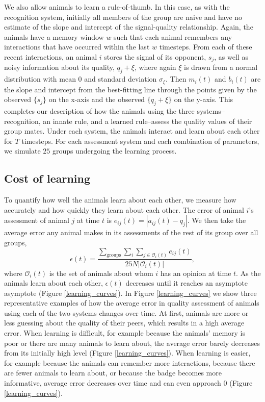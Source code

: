 We also allow animals to learn a rule-of-thumb. In this case, as with the recognition system, initially all members of the group are naive and have no estimate of the slope and intercept of the signal-quality relationship. Again, the animals have a memory window $w$ such that each animal remembers any interactions that have occurred within the last $w$ timesteps. From each of these recent interactions, an animal $i$ stores the signal of its opponent, $s_j$, as well as noisy information about its quality, $q_j+\xi$, where again $\xi$ is drawn from a normal distribution with mean $0$ and standard deviation $\sigma_\xi$.  Then $m_i(t)$ and $b_i(t)$ are the slope and intercept from the best-fitting line through the points given by the observed $\{s_j\}$ on the x-axis and the observed $\{q_j+\xi\}$ on the y-axis. This completes our description of how the animals using the three systems--recognition, an innate rule, and a learned rule--assess the quality values of their group mates. Under each system, the animals interact and learn about each other for $T$ timesteps. For each assessment system and each combination of parameters, we simulate $25$ groups undergoing the learning process. 
 
\subsection{Cost of learning }
To quantify how well the animals learn about each other, we measure how accurately and how quickly they learn about each other. The error of animal $i$'s assessment of animal $j$ at time $t$ is $e_{ij}(t)=|a_{ij}(t)-q_j|$. We then take the average error any animal makes in its assessments of the rest of its group over all groups, 
\begin{equation*}
\epsilon(t) = \frac{\sum_{\text{groups}}\sum_i\sum_{j\in \mathscr{O}_i(t)}e_{ij}(t)}{25N|\mathscr{O}_i(t)|},
\end{equation*}
where $\mathscr{O}_i(t)$ is the set of animals about whom $i$ has an opinion at time $t$.
As the animals learn about each other, $\epsilon(t)$ decreases until it reaches an asymptote asymptote (Figure \ref{learning_curves}). In Figure \ref{learning_curves} we show three representative examples of how the average error in quality assessment of animals using each of the two systems changes over time. At first, animals are more or less guessing about the quality of their peers, which results in a high average error. When learning is difficult, for example because the animals' memory is poor or there are many animals to learn about, the average error barely decreases from its initially high level (Figure \ref{learning_curves}). When learning is easier, for example because the animals can remember more interactions, because there are fewer animals to learn about, or because the badge becomes more informative, average error decreases over time and can even approach $0$ (Figure \ref{learning_curves}).  


